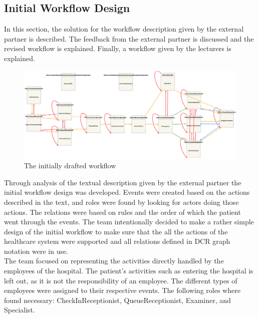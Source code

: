 \subsection{Initial Workflow Design}
In this section, the solution for the workflow description given by the external partner is described. The feedback from the external partner is discussed and the revised workflow is explained. Finally, a workflow given by the lecturers is explained.

\begin{figure}
\centering
\includegraphics[width=\linewidth]{Figures/initialbrazil}
\caption{\label{fig:InitialWorkflowDesign} The initially drafted workflow}
\end{figure}

Through analysis of the textual description given by the external partner the initial workflow design was developed. Events were created based on the actions described in the text, and roles were found by looking for actors doing those actions. The relations were based on rules and the order of which the patient went through the events.\newline
The team intentionally decided to make a rather simple design of the initial workflow to make sure that the all the actions of the healthcare system were supported and all relations defined in DCR graph notation were in use. \\

The team focused on representing the activities directly handled by the employees of the hospital. The patient’s activities such as entering the hospital is left out, as it is not the responsibility of an employee. The different types of employees were assigned to their respective events. The following roles where found necessary: CheckInReceptionist, QueueReceptionist, Examiner, and Specialist. \\

